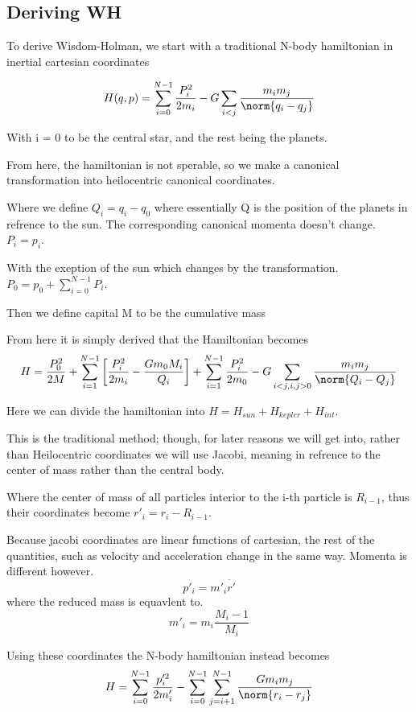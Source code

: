 \subsection{Deriving WH}

To derive Wisdom-Holman, we start with a traditional N-body hamiltonian in inertial cartesian coordinates

\[
H(q,p) = \sum_{i=0}^{N-1}\frac{P^2_i}
{2m_i} - G \sum_{i<j} \frac{m_i m_j}{\norm{q_i - q_j}} \]

With i = 0 to be the central star, and the rest being the planets.

From here, the hamiltonian is not sperable, so we make a canonical transformation into heilocentric canonical coordinates.

Where we define $Q_i = q_i -q_0$ where essentially Q is the position of the planets in refrence to the sun. The corresponding canonical momenta doesn't change. $P_i=p_i$.

With the exeption of the sun which changes by the transformation. $P_0 = p_0 + \sum^{N-1}_{i=0} P_i$.

Then we define capital M to be the cumulative mass

From here it is simply derived that the Hamiltonian becomes
\[
H = \frac{P_0^2}{2M} + \sum_{i=1}^{N-1} \left[\frac{P^2_i}{2m_i} - \frac{Gm_0 M_i}{Q_i}  \right] + \sum^{N-1}_{i=1} \frac{P^2_i}{2m_0} - G \sum_{i<j, i,j > 0} \frac{m_i m_j}{\norm{Q_i-Q_j}}
  \]

  Here we can divide the hamiltonian into $H = H_{sun} + H_{kepler} + H_{int}$.

  This is the traditional method; though, for later reasons we will get into, rather than Heilocentric coordinates we will use Jacobi, meaning in refrence to the center of mass rather than the central body.

  Where the center of mass of all particles interior to the i-th particle is $R_{i-1}$, thus their coordinates become $r'_i = r_i - R_{i-1}$.

  Because jacobi coordinates are linear functions of cartesian, the rest of the quantities, such as velocity and acceleration change in the same way. Momenta is different however.
\[
p'_i = m'_i \dot{r'}
  \]
  where the reduced mass is equavlent to.
\[
m'_i = m_i \frac{M_i-1}{M_i}
  \]



  Using these coordinates the N-body hamiltonian instead becomes
\[
H = \sum_{i=0}^{N-1}\frac{p'^2_i}{2m_i'} - \sum_{i=0}^{N-1} \sum_{j=i+1}^{N-1} \frac{G m_i m_j}{\norm{r_i - r_j}}
  \]

